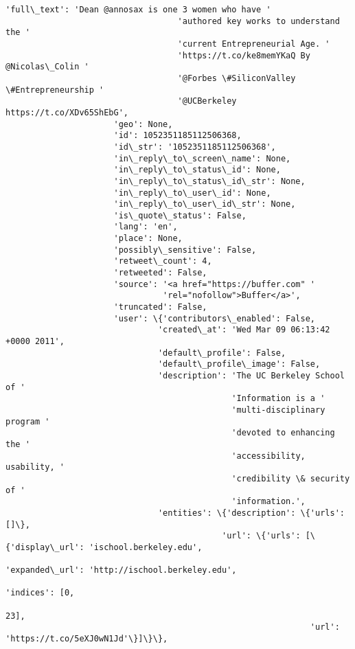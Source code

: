 \documentclass[11pt]{article}
\begin{document}
\begin{Verbatim}[commandchars=\\\{\}]
                      'full\_text': 'Dean @annosax is one 3 women who have '
                                   'authored key works to understand the '
                                   'current Entrepreneurial Age. '
                                   'https://t.co/ke8memYKaQ By @Nicolas\_Colin '
                                   '@Forbes \#SiliconValley \#Entrepreneurship '
                                   '@UCBerkeley https://t.co/XDv65ShEbG',
                      'geo': None,
                      'id': 1052351185112506368,
                      'id\_str': '1052351185112506368',
                      'in\_reply\_to\_screen\_name': None,
                      'in\_reply\_to\_status\_id': None,
                      'in\_reply\_to\_status\_id\_str': None,
                      'in\_reply\_to\_user\_id': None,
                      'in\_reply\_to\_user\_id\_str': None,
                      'is\_quote\_status': False,
                      'lang': 'en',
                      'place': None,
                      'possibly\_sensitive': False,
                      'retweet\_count': 4,
                      'retweeted': False,
                      'source': '<a href="https://buffer.com" '
                                'rel="nofollow">Buffer</a>',
                      'truncated': False,
                      'user': \{'contributors\_enabled': False,
                               'created\_at': 'Wed Mar 09 06:13:42 +0000 2011',
                               'default\_profile': False,
                               'default\_profile\_image': False,
                               'description': 'The UC Berkeley School of '
                                              'Information is a '
                                              'multi-disciplinary program '
                                              'devoted to enhancing the '
                                              'accessibility, usability, '
                                              'credibility \& security of '
                                              'information.',
                               'entities': \{'description': \{'urls': []\},
                                            'url': \{'urls': [\{'display\_url': 'ischool.berkeley.edu',
                                                              'expanded\_url': 'http://ischool.berkeley.edu',
                                                              'indices': [0,
                                                                          23],
                                                              'url': 'https://t.co/5eXJ0wN1Jd'\}]\}\},

\end{Verbatim}
\end{document}

